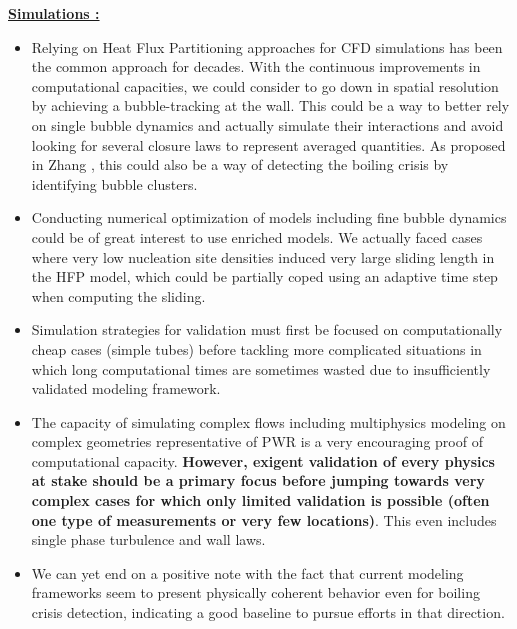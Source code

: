 \textbf{\underline{Simulations :}}

\begin{itemize}

\item Relying on Heat Flux Partitioning approaches for CFD simulations has been the common approach for decades. With the continuous improvements in computational capacities, we could consider to go down in spatial resolution by achieving a bubble-tracking at the wall. This could be a way to better rely on single bubble dynamics and actually simulate their interactions \cite{hong_investigation_2022} and avoid looking for several closure laws to represent averaged quantities. As proposed in Zhang \etal \cite{zhang_percolative_2019}, this could also be a way of detecting the boiling crisis by identifying bubble clusters.

\item Conducting numerical optimization of models including fine bubble dynamics could be of great interest to use enriched models. We actually faced cases where very low nucleation site densities induced very large sliding length in the HFP model, which could be partially coped using an adaptive time step when computing the sliding.

\item Simulation strategies for validation must first be focused on computationally cheap cases (\eg simple tubes) before tackling more complicated situations in which long computational times are sometimes wasted due to insufficiently validated modeling framework.

\item The capacity of simulating complex flows including multiphysics modeling on complex geometries representative of PWR is a very encouraging proof of computational capacity. \textbf{However, exigent validation of every physics at stake should be a primary focus before jumping towards very complex cases for which only limited validation is possible (often one type of measurements or very few locations)}. This even includes single phase turbulence and wall laws.

\item We can yet end on a positive note with the fact that current modeling frameworks seem to present physically coherent behavior even for boiling crisis detection, indicating a good baseline to pursue efforts in that direction.



\end{itemize}